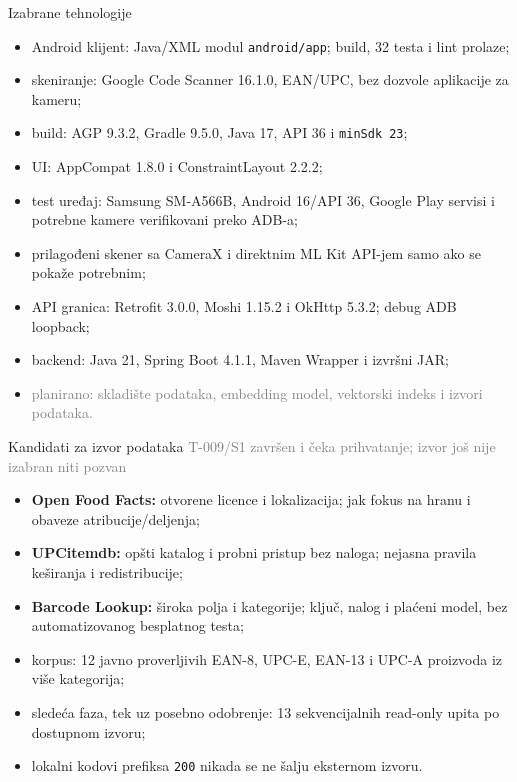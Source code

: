 \documentclass[aspectratio=169,11pt]{beamer}
\begin{document}
\begin{frame}{Izabrane tehnologije}
  \begin{itemize}
    \item Android klijent: Java/XML modul \texttt{android/app}; build, 32 testa i lint prolaze;
    \item skeniranje: Google Code Scanner 16.1.0, EAN/UPC, bez dozvole aplikacije za kameru;
    \item build: AGP 9.3.2, Gradle 9.5.0, Java 17, API 36 i \texttt{minSdk 23};
    \item UI: AppCompat 1.8.0 i ConstraintLayout 2.2.2;
    \item test uređaj: Samsung SM-A566B, Android 16/API 36, Google Play servisi i potrebne kamere verifikovani preko ADB-a;
    \item prilagođeni skener sa CameraX i direktnim ML Kit API-jem samo ako se pokaže potrebnim;
    \item API granica: Retrofit 3.0.0, Moshi 1.15.2 i OkHttp 5.3.2; debug ADB loopback;
    \item backend: Java 21, Spring Boot 4.1.1, Maven Wrapper i izvršni JAR;
    \item \textcolor{gray}{planirano: skladište podataka, embedding model, vektorski indeks i izvori podataka.}
  \end{itemize}
\end{frame}

\begin{frame}{Kandidati za izvor podataka}
  \textcolor{gray}{\footnotesize T-009/S1 završen i čeka prihvatanje; izvor još nije izabran niti pozvan}
  \begin{itemize}
    \item \textbf{Open Food Facts:} otvorene licence i lokalizacija; jak fokus na hranu i obaveze atribucije/deljenja;
    \item \textbf{UPCitemdb:} opšti katalog i probni pristup bez naloga; nejasna pravila keširanja i redistribucije;
    \item \textbf{Barcode Lookup:} široka polja i kategorije; ključ, nalog i plaćeni model, bez automatizovanog besplatnog testa;
    \item korpus: 12 javno proverljivih EAN-8, UPC-E, EAN-13 i UPC-A proizvoda iz više kategorija;
    \item sledeća faza, tek uz posebno odobrenje: 13 sekvencijalnih read-only upita po dostupnom izvoru;
    \item lokalni kodovi prefiksa \texttt{200} nikada se ne šalju eksternom izvoru.
  \end{itemize}
\end{frame}
\end{document}
